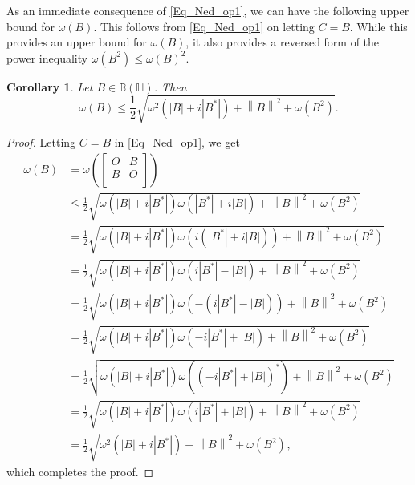 \documentclass[12pt,twoside,reqno]{amsart}
\newtheorem{corollary}{Corollary}[section]
\numberwithin{equation}{section}
\begin{document}
As an immediate consequence of \eqref{Eq_Ned_op1}, we can have the following upper bound for $\omega(B)$. This follows from \eqref{Eq_Ned_op1} on letting $C=B.$ While this provides an upper bound for $\omega(B)$, it also provides a reversed form of the power inequality $\omega(B^2)\leq \omega(B)^2.$
\begin{corollary}\label{7}
Let $B\in \mathbb B\left( {{\mathbb H}} \right)$. Then
\[\omega \left( B \right)\le \frac{1}{2}\sqrt{{{\omega }^{2}}\left( \left| B \right|+i\left| {{B}^{*}} \right| \right)+{{\left\| B \right\|}^{2}}+\omega \left( {{B}^{2}} \right)}.\]
\end{corollary}
\begin{proof}
Letting $C=B$ in \eqref{Eq_Ned_op1}, we get
	\[\begin{aligned}
   \omega \left( B \right)&=\omega \left( \left[ \begin{matrix}
   O & B  \\
   B & O  \\
\end{matrix} \right] \right) \\ 
 & \le \frac{1}{2}\sqrt{\omega \left( \left| B \right|+i\left| {{B}^{*}} \right| \right)\omega \left( \left| {{B}^{*}} \right|+i\left| B \right| \right)+{{\left\| B \right\|}^{2}}+\omega \left( {{B}^{2}} \right)} \\ 
 & =\frac{1}{2}\sqrt{\omega \left( \left| B \right|+i\left| {{B}^{*}} \right| \right)\omega \left( i\left( \left| {{B}^{*}} \right|+i\left| B \right| \right) \right)+{{\left\| B \right\|}^{2}}+\omega \left( {{B}^{2}} \right)} \\ 
 & =\frac{1}{2}\sqrt{\omega \left( \left| B \right|+i\left| {{B}^{*}} \right| \right)\omega \left( i\left| {{B}^{*}} \right|-\left| B \right| \right)+{{\left\| B \right\|}^{2}}+\omega \left( {{B}^{2}} \right)} \\ 
 & =\frac{1}{2}\sqrt{\omega \left( \left| B \right|+i\left| {{B}^{*}} \right| \right)\omega \left( -\left( i\left| {{B}^{*}} \right|-\left| B \right| \right) \right)+{{\left\| B \right\|}^{2}}+\omega \left( {{B}^{2}} \right)} \\ 
 & =\frac{1}{2}\sqrt{\omega \left( \left| B \right|+i\left| {{B}^{*}} \right| \right)\omega \left( -i\left| {{B}^{*}} \right|+\left| B \right| \right)+{{\left\| B \right\|}^{2}}+\omega \left( {{B}^{2}} \right)} \\ 
 & =\frac{1}{2}\sqrt{\omega \left( \left| B \right|+i\left| {{B}^{*}} \right| \right)\omega \left( {{\left( -i\left| {{B}^{*}} \right|+\left| B \right| \right)}^{*}} \right)+{{\left\| B \right\|}^{2}}+\omega \left( {{B}^{2}} \right)} \\ 
 & =\frac{1}{2}\sqrt{\omega \left( \left| B \right|+i\left| {{B}^{*}} \right| \right)\omega \left( i\left| {{B}^{*}} \right|+\left| B \right| \right)+{{\left\| B \right\|}^{2}}+\omega \left( {{B}^{2}} \right)} \\ 
 & =\frac{1}{2}\sqrt{{{\omega }^{2}}\left( \left| B \right|+i\left| {{B}^{*}} \right| \right)+{{\left\| B \right\|}^{2}}+\omega \left( {{B}^{2}} \right)},  
\end{aligned}\]
which completes the proof.
\end{proof}
\end{document}
